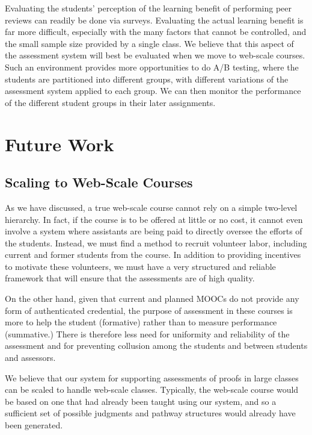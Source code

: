 \documentclass[12pt]{article}
\begin{document}
Evaluating the students' perception of the learning benefit of
performing peer reviews can readily be done via surveys.  Evaluating
the actual learning benefit is far more difficult, especially with the
many factors that cannot be controlled, and the small sample size
provided by a single class.  We believe that this aspect of
the assessment system will best be evaluated when we move to
web-scale courses.  Such an environment provides more opportunities to
do A/B testing, where the students are partitioned into different
groups, with different variations of the assessment system applied to
each group.  We can then monitor the performance of the different
student groups in their later assignments.

\section{Future Work}

\subsection{Scaling to Web-Scale Courses}

As we have discussed, a true web-scale course cannot rely on a simple
two-level hierarchy.  In fact, if the course is to be offered at
little or no cost, it cannot even involve a system where assistants
are being paid to directly oversee the efforts of the students.
Instead, we must find a method to recruit volunteer labor, including
current and former students from the course.  In addition to providing
incentives to motivate these volunteers, we must have a very
structured and reliable framework that will ensure that the
assessments are of high quality.

On the other hand, given that current and planned MOOCs do not provide
any form of authenticated credential, the purpose of assessment in
these courses is more to help the student (formative) rather than to
measure performance (summative.)  There is therefore less need for
uniformity and reliability of the assessment and for preventing
collusion among the students and between students and assessors.

We believe that our system for supporting assessments of proofs in
large classes can be scaled to handle web-scale classes.  Typically,
the web-scale course would be based on one that had already been
taught using our system, and so a sufficient set of possible judgments and
pathway structures would already have been generated.
\end{document}
